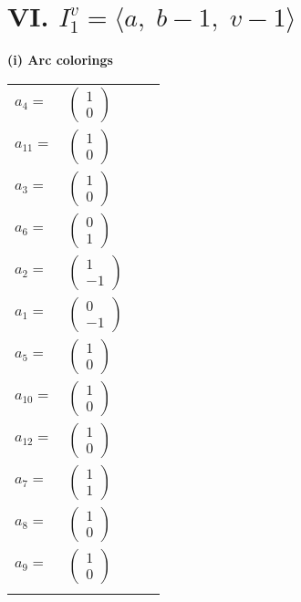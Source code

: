 \documentclass[1p]{elsarticle_modified}
\theoremstyle{definition}
\begin{document}
\centering \section*{VI. $I^v_{1}= \langle a,\;b-1,\;v-1 \rangle$}
\flushleft \textbf{(i) Arc colorings}\\
\begin{tabular}{m{7pt} m{180pt} m{7pt} m{180pt} }
\flushright $a_{4}=$&$\begin{pmatrix}1\\0\end{pmatrix}$ \\
\flushright $a_{11}=$&$\begin{pmatrix}1\\0\end{pmatrix}$ \\
\flushright $a_{3}=$&$\begin{pmatrix}1\\0\end{pmatrix}$ \\
\flushright $a_{6}=$&$\begin{pmatrix}0\\1\end{pmatrix}$ \\
\flushright $a_{2}=$&$\begin{pmatrix}1\\-1\end{pmatrix}$ \\
\flushright $a_{1}=$&$\begin{pmatrix}0\\-1\end{pmatrix}$ \\
\flushright $a_{5}=$&$\begin{pmatrix}1\\0\end{pmatrix}$ \\
\flushright $a_{10}=$&$\begin{pmatrix}1\\0\end{pmatrix}$ \\
\flushright $a_{12}=$&$\begin{pmatrix}1\\0\end{pmatrix}$ \\
\flushright $a_{7}=$&$\begin{pmatrix}1\\1\end{pmatrix}$ \\
\flushright $a_{8}=$&$\begin{pmatrix}1\\0\end{pmatrix}$ \\
\flushright $a_{9}=$&$\begin{pmatrix}1\\0\end{pmatrix}$\\&\end{tabular}
\end{document}
